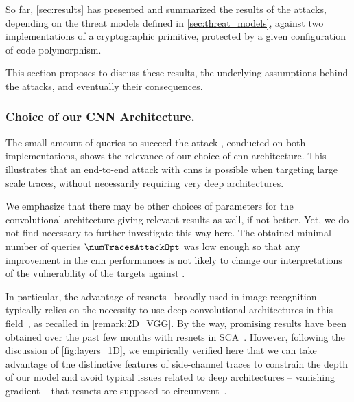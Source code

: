 So far, \autoref{sec:results} has presented and summarized the results of the attacks, depending on the threat models defined in \autoref{sec:threat_models}, against two implementations of a cryptographic primitive, protected by a given configuration of code polymorphism.

This section proposes to discuss these results, the underlying assumptions behind the attacks, and eventually their consequences.

\subsubsection{Choice of our CNN Architecture.}
The small amount of queries to succeed the attack \attCNN{}, conducted on both implementations, shows the relevance of our choice of \gls{cnn} architecture.
This illustrates that an end-to-end attack with \glspl{cnn} is possible when targeting large scale traces, without necessarily requiring very deep architectures.

We emphasize that there may be other choices of parameters for the convolutional architecture giving relevant results as well, if not better.
Yet, we do not find necessary to further investigate this way here.
The obtained minimal number of queries \(\numTracesAttackOpt\) was low enough so that any improvement in the \gls{cnn} performances is not likely to change our interpretations of the vulnerability of the targets against \attCNN{}.

In particular, the advantage of \glspl{resnet}~\cite{he_deep_2015} broadly used in image recognition typically relies on the necessity to use deep convolutional architectures in this field~\cite{simonyan_vgg_2015}, as recalled in \autoref{remark:2D_VGG}.
By the way, promising results have been obtained over the past few months with \glspl{resnet} in SCA~\cite{zhou_deep_2019,gohr_efficient_2020}.
However, following the discussion of \autoref{fig:layers_1D}, we empirically verified here that we can take advantage of the distinctive features of side-channel traces to constrain the depth of our model and avoid typical issues related to deep architectures -- \ie{} vanishing gradient -- that \glspl{resnet} are supposed to circumvent~\cite{he_deep_2015}.


